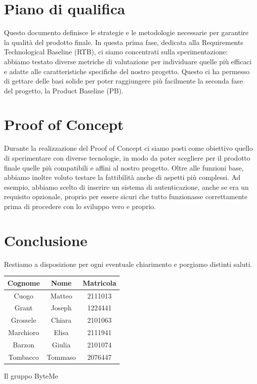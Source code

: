 \documentclass[11pt,a4paper]{article}
\begin{document}
\section{Piano di qualifica}
Questo documento definisce le strategie e le metodologie necessarie per garantire la qualità del prodotto finale. In questa prima fase, dedicata alla Requirements Technological Baseline (RTB), ci siamo concentrati sulla sperimentazione: abbiamo testato diverse metriche di valutazione per individuare quelle più efficaci e adatte alle caratteristiche specifiche del nostro progetto. Questo ci ha permesso di gettare delle basi solide per poter raggiungere più facilmente la seconda fase del progetto, la Product Baseline (PB).

\section{Proof of Concept}
Durante la realizzazione del Proof of Concept ci siamo posti come obiettivo quello di sperimentare con diverse tecnologie, in modo da poter scegliere per il prodotto finale quelle più compatibili e affini al nostro progetto. 
Oltre alle funzioni base, abbiamo inoltre voluto testare la fattibilità anche di aspetti più complessi. Ad esempio, abbiamo scelto di inserire un sistema di autenticazione, anche se era un requisito opzionale, proprio per essere sicuri che tutto funzionasse correttamente prima di procedere con lo sviluppo vero e proprio.



\newpage
\section{Conclusione}
Restiamo a disposizione per ogni eventuale chiarimento e porgiamo distinti saluti.


\begin{table}[H]
    \centering
    \begin{tabular}{|c|c|c|}
        \hline
        \textbf{Cognome} & \textbf{Nome} & \textbf{Matricola} \\
        \hline
        Cuogo & Matteo & 2111013 \\
        \hline
        Grant & Joseph & 1224441 \\
        \hline
        Grossele & Chiara & 2101063 \\
        \hline
        Marchioro & Elisa & 2111941 \\
        \hline
        Barzon & Giulia & 2101074 \\
        \hline
        Tombacco & Tommaso & 2076447 \\
        \hline
    \end{tabular}
\end{table}

\hfill Il gruppo ByteMe
\end{document}
